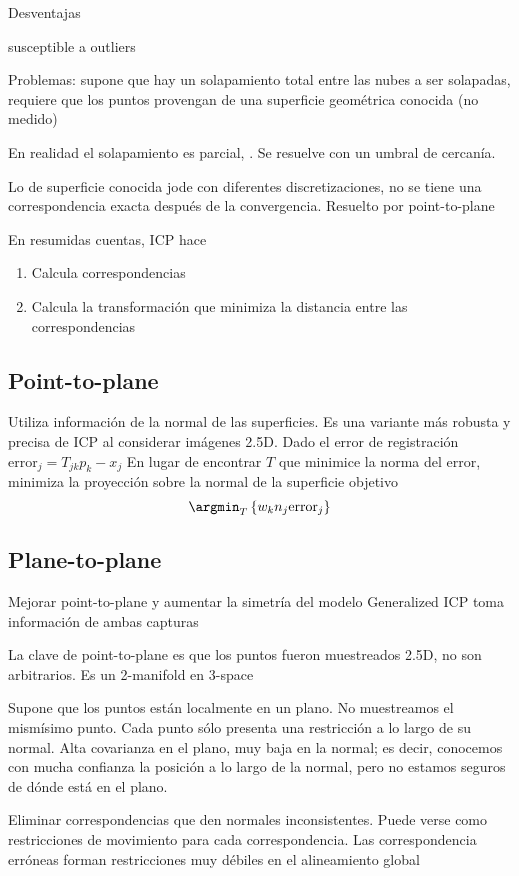Desventajas

susceptible a outliers 



Problemas:
	supone que hay un solapamiento total entre las nubes a ser solapadas,
	requiere que los puntos provengan de una superficie geométrica conocida (no medido)

En realidad el solapamiento es parcial, .
Se resuelve con un umbral de cercanía.

Lo de superficie conocida jode con diferentes discretizaciones,
no se tiene una correspondencia exacta después de la convergencia. Resuelto por point-to-plane


En resumidas cuentas, ICP hace
\begin{enumerate}
	\item Calcula correspondencias
	\item Calcula la transformación que minimiza la distancia entre las correspondencias
\end{enumerate}

\subsection{Point-to-plane}
Utiliza información de la normal de las superficies.
Es una variante más robusta y precisa de ICP al considerar imágenes 2.5D.
Dado el error de registración $ \mbox{error}_j = T_{jk} p_k - x_j$
En lugar de encontrar $T$ que minimice la norma del error, minimiza la proyección sobre la normal de la superficie objetivo
\[ \argmin_T \left\{ w_k n_j \mbox{error}_j \right\} \]

\subsection{Plane-to-plane}
Mejorar point-to-plane y aumentar la simetría del modelo 
Generalized ICP toma información de ambas capturas

La clave de point-to-plane es que los puntos fueron muestreados 2.5D, no son arbitrarios.
Es un 2-manifold en 3-space 

Supone que los puntos están localmente en un plano. No muestreamos el mismísimo punto.
Cada punto sólo presenta una restricción a lo largo de su normal.
Alta covarianza en el plano, muy baja en la normal; es decir, conocemos con mucha confianza
la posición a lo largo de la normal, pero no estamos seguros de dónde está en el plano.

Eliminar correspondencias que den normales inconsistentes.
Puede verse como restricciones de movimiento para cada correspondencia.
Las correspondencia erróneas forman restricciones muy débiles en el alineamiento global 

